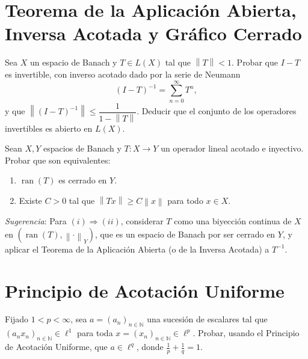 \documentclass{article}
\theoremstyle{definition}
\newcommand{\N}{\mathbb{N}}
\newcommand{\norm}[1]{\left\lVert #1 \right\rVert}       %
\newcommand{\ran}{\operatorname{ran}}
\newenvironment{ejercicio}[1]{\begin{trivlist}
\item[\hskip \labelsep {\bfseries Ejercicio}\hskip \labelsep {\bfseries #1.}]}{\end{trivlist}}
\begin{document}
\vspace{0.6cm}
\section{Teorema de la Aplicación Abierta, Inversa Acotada y Gráfico Cerrado}

\begin{ejercicio}{6}
    Sea \( X \) un espacio de Banach y \( T \in L(X) \) tal que \( \norm{T} < 1 \). Probar que \( I - T \) es invertible, con inverso acotado dado por la serie de Neumann
    \[
        {(I-T)}^{-1} = \sum_{n=0}^{\infty} T^n,
    \]
    y que \( \norm{{(I-T)}^{-1}} \le \dfrac{1}{1 - \norm{T}} \). Deducir que el conjunto de los operadores invertibles es abierto en \( L(X) \).
\end{ejercicio}

\vspace{0.3cm}

\begin{ejercicio}{7}
    Sean \( X, Y \) espacios de Banach y \( T : X \to Y \) un operador lineal acotado e inyectivo. Probar que son equivalentes:
    \begin{enumerate}
        \item \( \ran(T) \) es cerrado en \( Y \).
        \item Existe \( C > 0 \) tal que \( \norm{Tx} \ge C \norm{x} \) para todo \( x \in X \).
    \end{enumerate}
    \emph{Sugerencia}: Para \((i) \Rightarrow (ii)\), considerar \( T \) como una biyección continua de \( X \) en \( (\ran(T), \norm{\cdot}_Y) \), que es un espacio de Banach por ser cerrado en \(Y\), y aplicar el Teorema de la Aplicación Abierta (o de la Inversa Acotada) a \(T^{-1}\).
\end{ejercicio}

\vspace{0.6cm}
\section{Principio de Acotación Uniforme}

\begin{ejercicio}{8}
    Fijado \( 1 < p < \infty \), sea \( a = (a_n)_{n \in \N} \) una sucesión de escalares tal que \( (a_n x_n)_{n \in \N} \in \ell^1 \) para toda \( x = (x_n)_{n \in \N} \in \ell^p \). Probar, usando el Principio de Acotación Uniforme, que \( a \in \ell^q \), donde \( \frac1p + \frac1q = 1 \).
\end{ejercicio}
\end{document}

